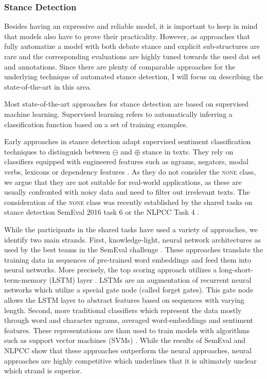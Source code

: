 \documentclass[11pt]{article}
\begin{document}
\subsubsection{Stance Detection}
\label{sec:sota}
Besides having an expressive and reliable model, it is important to keep in mind that models also have to prove their practicality.
However, as approaches that fully automatize a model with both debate stance and explicit sub-structures are rare and the corresponding evaluations are highly tuned towards the used dat set and annotations.
Since there are plenty of comparable approaches for the underlying technique of automated stance detection, I will focus on describing the state-of-the-art in this area.

Most state-of-the-art approaches for stance detection are based on supervised machine learning.
Supervised learning refers to automatically inferring a classification function based on a set of training examples. 

Early approaches in stance detection adapt supervised sentiment classification techniques to distinguish between $\ominus$ and $\oplus$ stance in texts.
They rely on classifiers equipped with engineered features such as ngrams, negators, modal verbs, lexicons or dependency features \cite{walker2012stance,anand2011cats,hasan2013stance,faulkner2014automated}. 
As they do not consider the \textsc{none} class, we argue that they are not suitable for real-world applications, as these are usually confronted with noisy data and need to filter out irrelevant texts.
The consideration of the \textsc{none} class was recently established by the shared tasks on stance detection SemEval 2016 task 6 \cite{StanceSemEval2016} or the NLPCC Task 4 \cite{xu2016overview}.

While the participants in the shared tasks have used a variety of approaches, we identify two main strands.
First, knowledge-light, neural network architectures as used by the best teams in the SemEval challenge \cite{zarrella2016mitre,wei2016pkudblab}.
These approaches translate the training data in sequences of pre-trained word embeddings and feed them into neural networks.
More precisely, the top scoring approach utilizes a long-short-term-memory (LSTM) layer \cite{zarrella2016mitre}.
LSTMs are an augmentation of recurrent neural networks which utilize a special gate node (called forget gates).   
This gate node allows the LSTM layer to abstract features based on sequences with varying length.
Second, more traditional classifiers which represent the data mostly through word and character ngrams, averaged word-embeddings and sentiment features.
These representations are than used to train models with algorithms such as support vector machines (SVMs) \cite{StanceSemEval2016,xu2016overview}. 
While the results of SemEval and NLPCC show that these approaches outperform the neural approaches, neural approaches are highly competitive which underlines that it is ultimately unclear which strand is superior.
\end{document}
